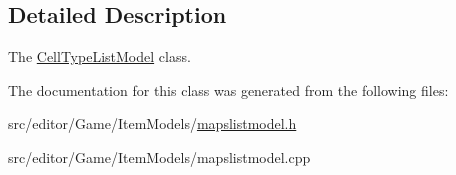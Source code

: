 \subsection{\-Detailed \-Description}
\-The \hyperlink{class_cell_type_list_model}{\-Cell\-Type\-List\-Model} class. 

\-The documentation for this class was generated from the following files\-:\begin{DoxyCompactItemize}
\item 
src/editor/\-Game/\-Item\-Models/\hyperlink{mapslistmodel_8h}{mapslistmodel.\-h}\item 
src/editor/\-Game/\-Item\-Models/mapslistmodel.\-cpp\end{DoxyCompactItemize}

